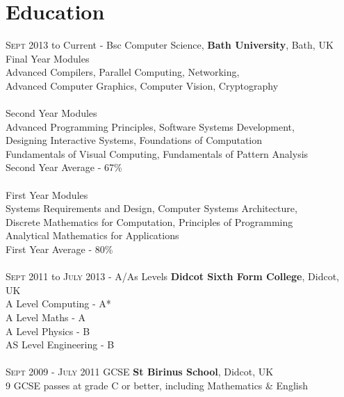 \documentclass[a4paper,10pt]{article}
\begin{document}
\section{Education}
 \textsc{Sept} 2013 to Current - Bsc Computer Science, \textbf{Bath University}, Bath, UK\\
\hspace*{0.5cm}Final Year Modules\\
\hspace*{1cm} Advanced Compilers, Parallel Computing, Networking, \\ \hspace*{1cm} Advanced Computer Graphics, Computer Vision, Cryptography\\
\\
\hspace*{0.5cm}Second Year Modules\\
\hspace*{1cm} Advanced Programming Principles, Software Systems Development, \\ \hspace*{1cm} Designing Interactive Systems, Foundations of Computation \\ \hspace*{1cm} Fundamentals of Visual Computing, Fundamentals of Pattern Analysis\\
\hspace*{0.5cm}Second Year Average - 67\%\\
\\
\hspace*{0.5cm}First Year Modules\\
\hspace*{1cm} Systems Requirements and Design, Computer Systems Architecture, \\ \hspace*{1cm} Discrete Mathematics for Computation, Principles of Programming\\ \hspace*{1cm} Analytical Mathematics for Applications\\
\hspace*{0.5cm}First Year Average - 80\%\\
\\
\textsc{Sept} 2011 to \textsc{July} 2013 - A/As Levels \textbf{Didcot Sixth Form College}, Didcot, UK\\
\hspace*{0.5cm}A Level Computing - A*\\
\hspace*{0.5cm}A Level Maths - A\\
\hspace*{0.5cm}A Level Physics - B\\
\hspace*{0.5cm}AS Level Engineering - B\\
\\
\textsc{Sept} 2009 - \textsc{July} 2011 GCSE \textbf{St Birinus School}, Didcot, UK\\
\hspace*{0.5cm}9 GCSE passes at grade C or better, including Mathematics \& English \\
\end{document}
